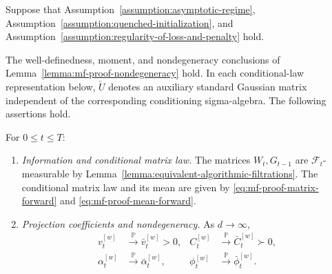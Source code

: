 \begin{proposition}
\label{proposition:master-recursion}
Suppose that
Assumption~\ref{assumption:asymptotic-regime},
Assumption~\ref{assumption:quenched-initialization},
and Assumption~\ref{assumption:regularity-of-loss-and-penalty} hold.

The well-definedness, moment, and nondegeneracy conclusions
of Lemma~\ref{lemma:mf-proof-nondegeneracy} hold.
In each conditional-law representation below, $\check U$ denotes
an auxiliary standard Gaussian matrix independent of the
corresponding conditioning sigma-algebra.
The following assertions hold.

\begin{description}[wide]
    \item[$(\mathsf F_t)$ Forward half-step:]
    For $0\leq t\leq T$:
    \begin{enumerate}[label=(\roman*),wide]
        \item \emph{Information and conditional matrix law.}
        The matrices $W_t,G_{t-1}$ are $\mathcal F_t$-measurable by
        Lemma~\ref{lemma:equivalent-algorithmic-filtrations}.
        The conditional matrix law and its mean are given by
        \eqref{eq:mf-proof-matrix-forward}
        and \eqref{eq:mf-proof-mean-forward}.

        \item \emph{Projection coefficients and nondegeneracy.}
        As $d\to\infty$,
        \begin{align}
            v_t^{[w]}
            &\xrightarrow{\mathbb P}\bar v_t^{[w]}>0,
            &
            C_t^{[w]}
            &\xrightarrow{\mathbb P}\bar C_t^{[w]}\succ0,
            \label{eq:master-forward-nondegeneracy}
            \\
            \alpha_t^{[w]}
            &\xrightarrow{\mathbb P}\bar\alpha_t^{[w]},
            &
            \phi_t^{[w]}
            &\xrightarrow{\mathbb P}\bar\phi_t^{[w]}.
            \label{eq:master-forward-coefficient-convergence}
        \end{align}


\end{enumerate}
\end{description}
\end{proposition}
